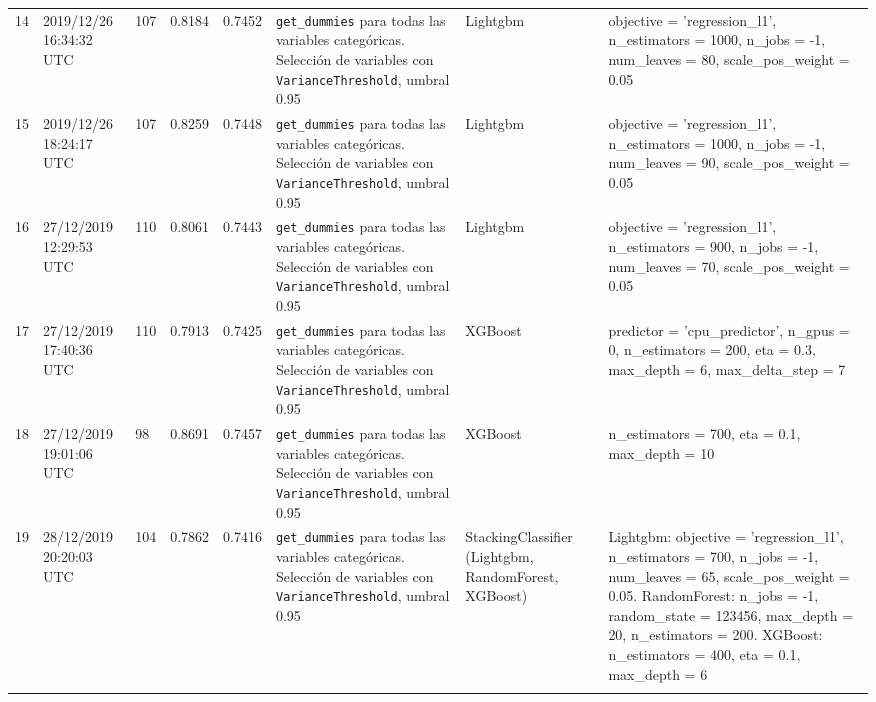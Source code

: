\documentclass[a4paper, 20pt]{article}
\begin{document}
\begin{longtable}{lL{2cm}lllL{3cm}L{2.5cm}L{3.5cm}}
14 & 2019/12/26 16:34:32 UTC & 107 & 0.8184 & 0.7452 & \texttt{get\_dummies} para todas las variables categóricas. Selección de variables con \texttt{VarianceThreshold}, umbral 0.95 & Lightgbm & {\ttfamily objective = 'regression\_l1', n\_estimators = 1000, n\_jobs = -1, num\_leaves = 80, scale\_pos\_weight = 0.05}\\
\midrule

15 & 2019/12/26 18:24:17 UTC & 107 & 0.8259 & 0.7448 &\texttt{get\_dummies} para todas las variables categóricas. Selección de variables con \texttt{VarianceThreshold}, umbral 0.95 & Lightgbm & {\ttfamily objective = 'regression\_l1', n\_estimators = 1000, n\_jobs = -1, num\_leaves = 90, scale\_pos\_weight = 0.05}\\
\midrule

16 & 27/12/2019 12:29:53 UTC & 110 & 0.8061 & 0.7443 & \texttt{get\_dummies} para todas las variables categóricas. Selección de variables con \texttt{VarianceThreshold}, umbral 0.95 & Lightgbm & {\ttfamily objective = 'regression\_l1', n\_estimators = 900, n\_jobs = -1, num\_leaves = 70, scale\_pos\_weight = 0.05}\\
\midrule

17 & 27/12/2019 17:40:36 UTC & 110 & 0.7913 & 0.7425  & \texttt{get\_dummies} para todas las variables categóricas. Selección de variables con \texttt{VarianceThreshold}, umbral 0.95 & XGBoost & {\ttfamily predictor = 'cpu\_predictor', n\_gpus = 0, n\_estimators = 200, eta = 0.3, max\_depth = 6, max\_delta\_step = 7}\\
\midrule

18 & 27/12/2019 19:01:06 UTC & 98 & 0.8691 & 0.7457 & \texttt{get\_dummies} para todas las variables categóricas. Selección de variables con \texttt{VarianceThreshold}, umbral 0.95 & XGBoost & {\ttfamily n\_estimators = 700, eta = 0.1, max\_depth = 10}\\
\midrule

19 & 28/12/2019 20:20:03 UTC & 104 & 0.7862 & 0.7416 & \texttt{get\_dummies} para todas las variables categóricas. Selección de variables con \texttt{VarianceThreshold}, umbral 0.95 & StackingClassifier (Lightgbm, RandomForest, XGBoost) & Lightgbm: {\ttfamily objective = 'regression\_l1', n\_estimators = 700, n\_jobs = -1, num\_leaves = 65, scale\_pos\_weight = 0.05}. RandomForest: {\ttfamily n\_jobs = -1, random\_state = 123456, max\_depth = 20, n\_estimators = 200}. XGBoost: {\ttfamily n\_estimators = 400, eta = 0.1, max\_depth = 6}\\
\midrule


\end{longtable}
\end{document}
